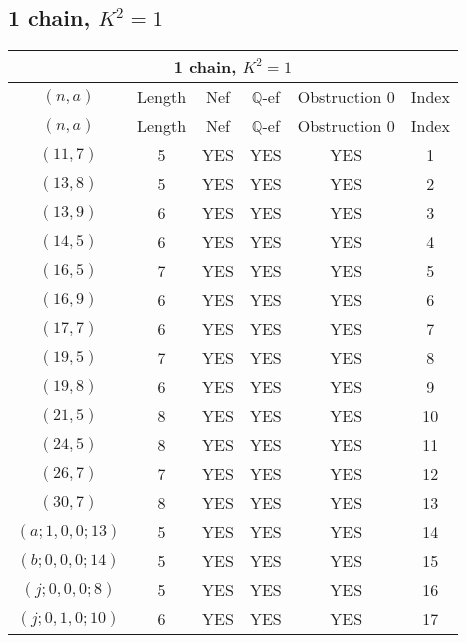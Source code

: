 \subsection{1 chain, $K^2 = 1$}
\begin{longtable}{|c|c|c|c|c|c|}
\hline
\multicolumn{6}{|c|}{1 chain, $K^2 = 1$}\\
\hline
$(n,a)$ & Length & Nef & $\mathbb Q$-ef & Obstruction 0 & Index\\
\hline
\endfirsthead

\hline
$(n,a)$ & Length & Nef & $\mathbb Q$-ef & Obstruction 0 & Index\\
\hline
\endhead
\hline
\endfoot

$(11, 7)$ & 5 & YES & YES & YES & 1\\
$(13, 8)$ & 5 & YES & YES & YES & 2\\
$(13, 9)$ & 6 & YES & YES & YES & 3\\
$(14, 5)$ & 6 & YES & YES & YES & 4\\
$(16, 5)$ & 7 & YES & YES & YES & 5\\
$(16, 9)$ & 6 & YES & YES & YES & 6\\
$(17, 7)$ & 6 & YES & YES & YES & 7\\
$(19, 5)$ & 7 & YES & YES & YES & 8\\
$(19, 8)$ & 6 & YES & YES & YES & 9\\
$(21, 5)$ & 8 & YES & YES & YES & 10\\
$(24, 5)$ & 8 & YES & YES & YES & 11\\
$(26, 7)$ & 7 & YES & YES & YES & 12\\
$(30, 7)$ & 8 & YES & YES & YES & 13\\
$(a; 1, 0, 0; 13)$ & 5 & YES & YES & YES & 14\\
$(b; 0, 0, 0; 14)$ & 5 & YES & YES & YES & 15\\
$(j; 0, 0, 0; 8)$ & 5 & YES & YES & YES & 16\\
$(j; 0, 1, 0; 10)$ & 6 & YES & YES & YES & 17
\end{longtable}
